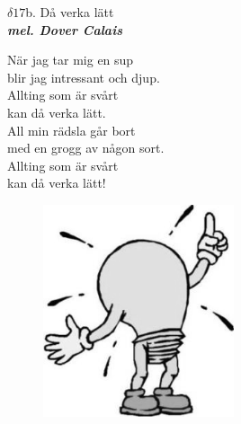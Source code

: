 \documentclass[a6paper,10pt]{article}
\newcommand{\mel}[1]{\small\textbf{\textit{mel. #1 \\}}}
\begin{document}
\newpage
\setlength{\oddsidemargin}{-0.37in}
\noindent
\begin{center}
\Large $\delta17$b. Då verka lätt\\ 
\mel{Dover Calais}
\end{center}
När jag tar mig en sup \\
blir jag intressant och djup. \\
Allting som är svårt \\
kan då verka lätt. 
\vspace{5pt}\\
All min rädsla går bort \\
med en grogg av någon sort. \\
Allting som är svårt \\
kan då verka lätt! 
\vspace{40pt}
\begin{figure}[!h]
\centering
\includegraphics[width=0.5\textwidth]{aha.png}
\end{figure}
\end{document}
